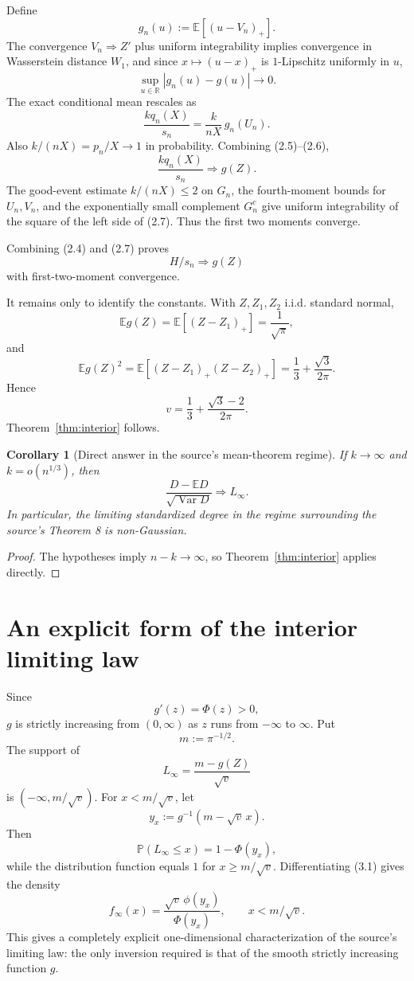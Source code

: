 \documentclass[11pt]{article}
\newtheorem{corollary}[theorem]{Corollary}
\theoremstyle{remark}
\newcommand{\E}{\mathbb E}
\newcommand{\Pp}{\mathbb P}
\newcommand{\Var}{\operatorname{Var}}
\newcommand{\1}{\mathbf 1}
\newcommand{\R}{\mathbb R}
\begin{document}
Define
\[
g_n(u):=\E[(u-V_n)_+].
\]
The convergence $V_n\Rightarrow Z'$ plus uniform integrability implies convergence in Wasserstein distance $W_1$, and since $x\mapsto(u-x)_+$ is $1$-Lipschitz uniformly in $u$,
\[
\sup_{u\in\R}|g_n(u)-g(u)|\to0.
\tag{2.5}
\]
The exact conditional mean rescales as
\[
\frac{kq_n(X)}{s_n}
=
\frac{k}{nX}\,g_n(U_n).
\tag{2.6}
\]
Also $k/(nX)=p_n/X\to1$ in probability. Combining (2.5)--(2.6),
\[
\frac{kq_n(X)}{s_n}\Longrightarrow g(Z).
\tag{2.7}
\]
The good-event estimate $k/(nX)\le2$ on $G_n$, the fourth-moment bounds for $U_n,V_n$, and the exponentially small complement $G_n^c$ give uniform integrability of the square of the left side of (2.7). Thus the first two moments converge.

Combining (2.4) and (2.7) proves
\[
H/s_n\Rightarrow g(Z)
\]
with first-two-moment convergence.

It remains only to identify the constants. With $Z,Z_1,Z_2$ i.i.d. standard normal,
\[
\E g(Z)=\E[(Z-Z_1)_+]=\frac1{\sqrt\pi},
\]
and
\[
\E g(Z)^2
=
\E[(Z-Z_1)_+(Z-Z_2)_+]
=
\frac13+\frac{\sqrt3}{2\pi}.
\]
Hence
\[
v=\frac13+\frac{\sqrt3-2}{2\pi}.
\]
Theorem~\ref{thm:interior} follows.

\begin{corollary}[Direct answer in the source's mean-theorem regime]\label{cor:source}
If $k\to\infty$ and $k=o(n^{1/3})$, then
\[
\frac{D-\E D}{\sqrt{\Var D}}\Longrightarrow L_\infty.
\]
In particular, the limiting standardized degree in the regime surrounding the source's Theorem 8 is non-Gaussian.
\end{corollary}

\begin{proof}
The hypotheses imply $n-k\to\infty$, so Theorem~\ref{thm:interior} applies directly.
\end{proof}

\section{An explicit form of the interior limiting law}

Since
\[
g'(z)=\Phi(z)>0,
\]
$g$ is strictly increasing from $(0,\infty)$ as $z$ runs from $-\infty$ to $\infty$. Put
\[
m:=\pi^{-1/2}.
\]
The support of
\[
L_\infty=\frac{m-g(Z)}{\sqrt v}
\]
is $(-\infty,m/\sqrt v)$. For $x<m/\sqrt v$, let
\[
y_x:=g^{-1}(m-\sqrt v\,x).
\]
Then
\[
\Pp(L_\infty\le x)=1-\Phi(y_x),
\tag{3.1}
\]
while the distribution function equals $1$ for $x\ge m/\sqrt v$. Differentiating (3.1) gives the density
\[
f_\infty(x)
=
\frac{\sqrt v\,\phi(y_x)}{\Phi(y_x)},
\qquad x<m/\sqrt v.
\tag{3.2}
\]
This gives a completely explicit one-dimensional characterization of the source's limiting law: the only inversion required is that of the smooth strictly increasing function $g$.
\end{document}
